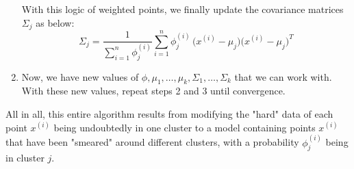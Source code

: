 \documentclass{article}
\begin{document}
\begin{definition}[EM Algorithm]
\begin{enumerate}
          With this logic of weighted points, we finally update the covariance matrices $\Sigma_j$ as below:
          \[\Sigma_j = \frac{1}{\sum_{i=1}^n \phi_j^{(i)}} \sum_{i=1}^n \phi^{(i)}_j \,\big(x^{(i)} - \mu_j\big)\big(x^{(i)} - \mu_j\big)^T\]

          \item Now, we have new values of $\phi, \mu_1, \ldots, \mu_k, \Sigma_1, \ldots, \Sigma_k$ that we can work with. With these new values, repeat steps 2 and 3 until convergence.
        \end{enumerate}

        All in all, this entire algorithm results from modifying the "hard" data of each point $x^{(i)}$ being undoubtedly in one cluster to a model containing points $x^{(i)}$ that have been "smeared" around different clusters, with a probability $\phi_j^{(i)}$ being in cluster $j$. 
      \end{definition}
\end{document}
